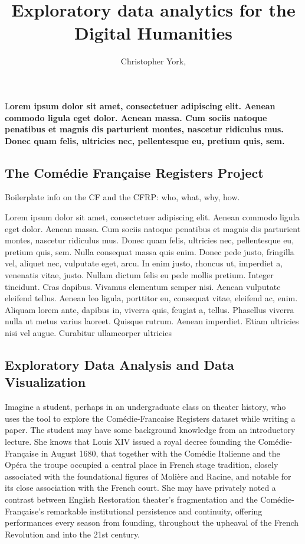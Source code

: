 \documentclass[	DIV=calc,%
							paper=a4,%
							fontsize=11pt,%
							twocolumn]{scrartcl}	 					%
\title{Exploratory data analytics for the Digital Humanities}					%
\author{Christopher York, }											%
\date{}																				%
\newcommand{\initial}[1]{%
     \lettrine[lines=3,lhang=0.3,nindent=0em]{
     				\color{DarkGoldenrod}
     				{\textsf{#1}}}{}}
\begin{document}
\maketitle
\thispagestyle{fancy} 			%
\initial{L}\textbf{orem ipsum dolor sit amet, consectetuer adipiscing elit. Aenean commodo ligula eget dolor. Aenean massa. Cum sociis natoque penatibus et magnis dis parturient montes, nascetur ridiculus mus. Donec quam felis, ultricies nec, pellentesque eu, pretium quis, sem.}

\subsection*{The Comédie Française Registers Project}
Boilerplate info on the CF and the CFRP: who, what, why, how.

Lorem ipsum dolor sit amet, consectetuer adipiscing elit. Aenean commodo ligula eget dolor. Aenean massa. Cum sociis natoque penatibus et magnis dis parturient montes, nascetur ridiculus mus. Donec quam felis, ultricies nec, pellentesque eu, pretium quis, sem. Nulla consequat massa quis enim. Donec pede justo, fringilla vel, aliquet nec, vulputate eget, arcu. In enim justo, rhoncus ut, imperdiet a, venenatis vitae, justo. Nullam dictum felis eu pede mollis pretium. Integer tincidunt. Cras dapibus. Vivamus elementum semper nisi. Aenean vulputate eleifend tellus. Aenean leo ligula, porttitor eu, consequat vitae, eleifend ac, enim. Aliquam lorem ante, dapibus in, viverra quis, feugiat a, tellus. Phasellus viverra nulla ut metus varius laoreet. Quisque rutrum. Aenean imperdiet. Etiam ultricies nisi vel augue. Curabitur ullamcorper ultricies

\subsection*{Exploratory Data Analysis and Data Visualization}

Imagine a student, perhaps in an undergraduate class on theater history, who uses the tool to explore the Comédie-Francaise Registers dataset while writing a paper. The student may have some background knowledge from an introductory lecture.  She knows that Louis XIV issued a royal decree founding the Comédie-Française in August 1680, that together with the Comédie Italienne and the Opéra the troupe occupied a central place in French stage tradition, closely associated with the foundational figures of Molière and Racine, and notable for its close association with the French court.  She may have privately noted a contrast between English Restoration theater’s fragmentation and the Comédie-Française’s remarkable institutional persistence and continuity, offering performances every season from founding, throughout the upheaval of the French Revolution and into the 21st century.
\end{document}
